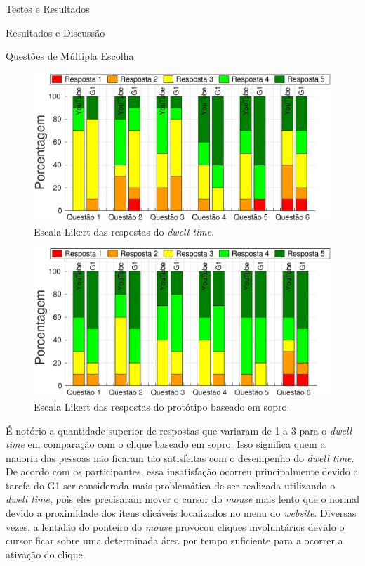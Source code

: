 \begin{chapter}{Testes e Resultados}
\begin{section}{Resultados e Discussão}
\begin{subsection}{Questões de Múltipla Escolha}
\begin{figure}[!h]
	\centering
	\begin{minipage}[c]{\textwidth}
	\centering
	\includegraphics[width=0.9\linewidth]{fig/DwellQuestions}
	\caption{Escala Likert das respostas do \textit{dwell time}.} 
	\label{fig:DwellQuestions}
	\end{minipage}
\end{figure}

\begin{figure}[!h]
	\centering
	\begin{minipage}[c]{\textwidth}
	\centering
	\includegraphics[width=0.9\linewidth]{fig/PuffQuestions}
	\caption{Escala Likert das respostas do protótipo baseado em sopro.}
	\label{fig:PuffQuestions}
	\end{minipage}
\end{figure}



É notório a quantidade superior de respostas que variaram de 1 a 3 para o
\textit{dwell time} em comparação com o clique baseado em sopro. Isso significa
quem a maioria das pessoas não ficaram tão satisfeitas com o desempenho do
\textit{dwell time}. De acordo com os participantes, essa insatisfação ocorreu
principalmente devido a tarefa do G1 ser considerada mais problemática de ser
realizada utilizando o \textit{dwell time}, pois eles precisaram mover o
cursor do \textit{mouse} mais lento que o normal devido a proximidade dos itens
clicáveis localizados no menu do \textit{website}. Diversas vezes, a lentidão do
ponteiro do \textit{mouse} provocou cliques involuntários devido o cursor ficar
sobre uma determinada área por tempo suficiente para a ocorrer a ativação do
clique.


\end{subsection}
\end{section}
\end{chapter}
